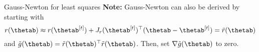 \documentclass[11pt,compress,t,notes=noshow, xcolor=table]{beamer}
\begin{document}
\begin{vbframe}{Gauss-Newton for least squares}
\textbf{Note:} Gauss-Newton can also be derived by starting with
\begin{equation*}
    r(\thetab) \approx r(\thetab^{[t]}) + J_r(\thetab^{[t]})^\top (\thetab - \thetab^{[t]}) = \tilde{r}(\thetab)
\end{equation*}
and $\tilde{g}(\thetab) = \tilde{r}(\thetab)^\top \tilde{r}(\thetab)$.
Then, set $\nabla \tilde{g}(\thetab)$ to zero.








\end{vbframe}
\end{document}
